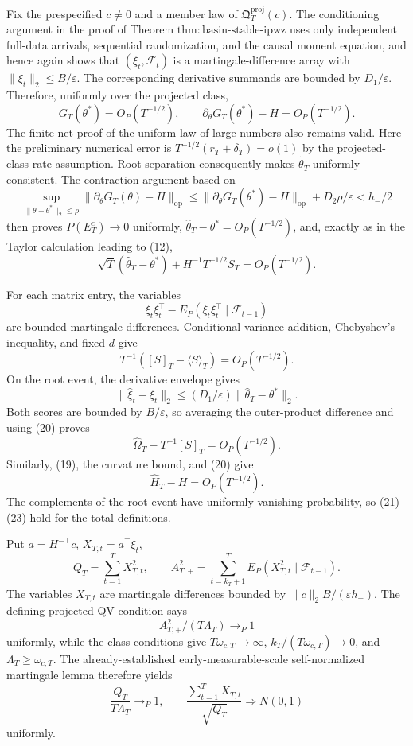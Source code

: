 Fix the prespecified \(c\ne0\) and a member law of \(\mathfrak Q_T^{\mathrm{proj}}(c)\).  The conditioning argument in the proof of Theorem \(\mathrm{thm:basin\text{-}stable\text{-}ipwz}\) uses only independent full-data arrivals, sequential randomization, and the causal moment equation, and hence again shows that \((\xi_t,\mathcal F_t)\) is a martingale-difference array with \(\|\xi_t\|_2\le B/\varepsilon\).  The corresponding derivative summands are bounded by \(D_1/\varepsilon\).  Therefore, uniformly over the projected class,
\[
 G_T(\theta^*)=O_P(T^{-1/2}),
 \qquad
 \partial_\theta G_T(\theta^*)-H=O_P(T^{-1/2}).                            \tag{19}
\]
The finite-net proof of the uniform law of large numbers also remains valid.  Here the preliminary numerical error is \(T^{-1/2}(r_T+\delta_T)=o(1)\) by the projected-class rate assumption.  Root separation consequently makes \(\widetilde\theta_T\) uniformly consistent.  The contraction argument based on
\[
 \sup_{\|\theta-\theta^*\|_2\le\rho}
 \|\partial_\theta G_T(\theta)-H\|_{\mathrm{op}}
 \le \|\partial_\theta G_T(\theta^*)-H\|_{\mathrm{op}}+D_2\rho/\varepsilon
 <h_-/2
\]
then proves \(P(E_T^c)\to0\) uniformly, \(\widehat\theta_T-\theta^*=O_P(T^{-1/2})\), and, exactly as in the Taylor calculation leading to (12),
\[
 \sqrt T(\widehat\theta_T-\theta^*)+H^{-1}T^{-1/2}S_T=O_P(T^{-1/2}).       \tag{20}
\]

For each matrix entry, the variables
\[
 \xi_t\xi_t^\top-E_P(\xi_t\xi_t^\top\mid\mathcal F_{t-1})
\]
are bounded martingale differences.  Conditional-variance addition, Chebyshev's inequality, and fixed \(d\) give
\[
 T^{-1}([S]_T-\langle S\rangle_T)=O_P(T^{-1/2}).                           \tag{21}
\]
On the root event, the derivative envelope gives
\[
 \|\widehat\xi_t-\xi_t\|_2
 \le(D_1/\varepsilon)\|\widehat\theta_T-\theta^*\|_2.
\]
Both scores are bounded by \(B/\varepsilon\), so averaging the outer-product difference and using (20) proves
\[
 \widehat\Omega_T-T^{-1}[S]_T=O_P(T^{-1/2}).                              \tag{22}
\]
Similarly, (19), the curvature bound, and (20) give
\[
 \widehat H_T-H=O_P(T^{-1/2}).                                            \tag{23}
\]
The complements of the root event have uniformly vanishing probability, so (21)--(23) hold for the total definitions.

Put \(a=H^{-\top}c\), \(X_{T,t}=a^\top\xi_t\),
\[
 Q_T=\sum_{t=1}^TX_{T,t}^2,
 \qquad
 A_{T,+}^2=\sum_{t=k_T+1}^TE_P(X_{T,t}^2\mid\mathcal F_{t-1}).
\]
The variables \(X_{T,t}\) are martingale differences bounded by \(\|c\|_2B/(\varepsilon h_-)\).  The defining projected-QV condition says
\[
 A_{T,+}^2/(T\Lambda_T)\to_P1
\]
uniformly, while the class conditions give \(T\omega_{c,T}\to\infty\), \(k_T/(T\omega_{c,T})\to0\), and \(\Lambda_T\ge\omega_{c,T}\).  The already-established early-measurable-scale self-normalized martingale lemma therefore yields
\[
 \frac{Q_T}{T\Lambda_T}\to_P1,
 \qquad
 \frac{\sum_{t=1}^TX_{T,t}}{\sqrt{Q_T}}\Rightarrow N(0,1)                \tag{24}
\]
uniformly.

